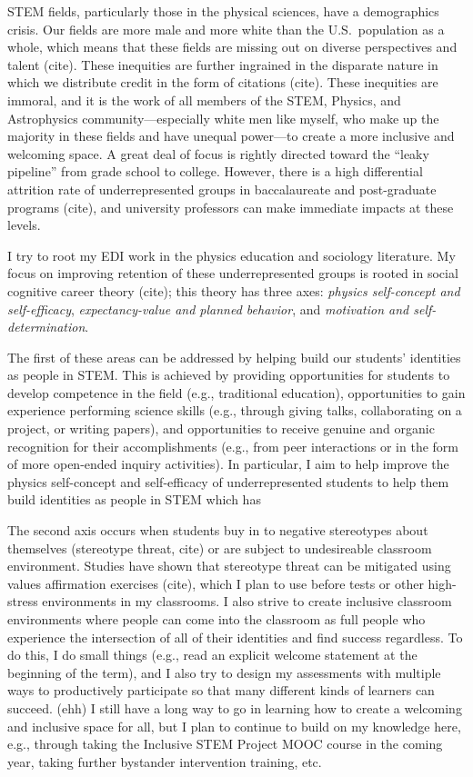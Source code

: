 \documentclass[11pt]{article}
\begin{document}
\thispagestyle{fancy}


STEM fields, particularly those in the physical sciences, have a demographics crisis. 
Our fields are more male and more white than the U.S.~population as a whole, which means that these fields are missing out on diverse perspectives and talent (cite). 
These inequities are further ingrained in the disparate nature in which we distribute credit in the form of citations (cite).
These inequities are immoral, and it is the work of all members of the STEM, Physics, and Astrophysics community---especially white men like myself, who make up the majority in these fields and have unequal power---to create a more inclusive and welcoming space.
A great deal of focus is rightly directed toward the “leaky pipeline” from grade school to college.
However, there is a high differential attrition rate of underrepresented groups in baccalaureate and post-graduate programs (cite), and university professors can make immediate impacts at these levels.

I try to root my EDI work in the physics education and sociology literature.
My focus on improving retention of these underrepresented groups is rooted in social cognitive career theory (cite); this theory has three axes: \emph{physics self-concept and self-efficacy}, \emph{expectancy-value and planned behavior}, and \emph{motivation and self-determination}.

The first of these areas can be addressed by helping build our students' identities as people in STEM.
This is achieved by providing opportunities for students to develop competence in the field (e.g., traditional education), opportunities to gain experience performing science skills (e.g., through giving talks, collaborating on a project, or writing papers), and opportunities to receive genuine and organic recognition for their accomplishments (e.g., from peer interactions or in the form of more open-ended inquiry activities).
In particular, I aim to help improve the physics self-concept and self-efficacy of underrepresented students to help them build identities as people in STEM which has 

The second axis occurs when students buy in to negative stereotypes about themselves (stereotype threat, cite) or are subject to undesireable classroom environment.
Studies have shown that stereotype threat can be mitigated using values affirmation exercises (cite), which I plan to use before tests or other high-stress environments in my classrooms.
I also strive to create inclusive classroom environments where people can come into the classroom as full people who experience the intersection of all of their identities and find success regardless.
To do this, I do small things (e.g., read an explicit welcome statement at the beginning of the term), and I also try to design my assessments with multiple ways to productively participate so that many different kinds of learners can succeed. (ehh)
I still have a long way to go in learning how to create a welcoming and inclusive space for all, but I plan to continue to build on my knowledge here, e.g., through taking the Inclusive STEM Project MOOC course in the coming year, taking further bystander intervention training, etc.
\end{document}

